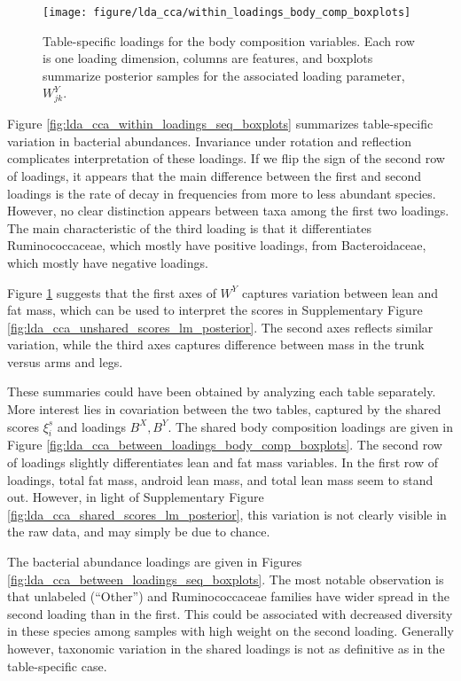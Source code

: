 \documentclass[14pt]{extarticle}
\begin{document}
\begin{figure}
  \centering
  \texttt{[image: figure/lda\_cca/within\_loadings\_body\_comp\_boxplots]}
  \caption{Table-specific loadings for the body composition variables. Each row
    is one loading dimension, columns are features, and boxplots summarize
    posterior samples for the associated loading parameter, $W_{jk}^{Y}$.
  \label{fig:lda_cca_within_loadings_body_comp_boxplots}}
\end{figure}

Figure \ref{fig:lda_cca_within_loadings_seq_boxplots} summarizes table-specific variation in
bacterial abundances. Invariance under rotation and reflection complicates
interpretation of these loadings. If we flip the sign of the second row of
loadings, it appears that the main difference between the first and second
loadings is the rate of decay in frequencies from more to less abundant species.
However, no clear distinction appears between taxa among the first two loadings.
The main characteristic of the third loading is that it differentiates
Ruminococcaceae, which mostly have positive loadings, from Bacteroidaceae, which
mostly have negative loadings.

Figure \ref{fig:lda_cca_within_loadings_body_comp_boxplots} suggests that the
first axes of $W^{Y}$ captures variation between lean and fat mass, which can be
used to interpret the scores in Supplementary Figure
\ref{fig:lda_cca_unshared_scores_lm_posterior}. The second axes reflects similar
variation, while the third axes captures difference between mass in the trunk
versus arms and legs.

These summaries could have been obtained by analyzing each table separately.
More interest lies in covariation between the two tables, captured by the shared
scores $\xi_{i}^{s}$ and loadings $B^{X}, B^{Y}$. The shared body composition
loadings are given in Figure
\ref{fig:lda_cca_between_loadings_body_comp_boxplots}. The second row of
loadings slightly differentiates lean and fat mass variables. In the first row
of loadings, total fat mass, android lean mass, and total lean mass seem to
stand out. However, in light of Supplementary Figure
\ref{fig:lda_cca_shared_scores_lm_posterior}, this variation is not clearly
visible in the raw data, and may simply be due to chance.

The bacterial abundance loadings are given in Figures
\ref{fig:lda_cca_between_loadings_seq_boxplots}. The most notable observation is
that unlabeled (``Other'') and Ruminococcaceae families have wider spread in the
second loading than in the first. This could be associated with decreased
diversity in these species among samples with high weight on the second loading.
Generally however, taxonomic variation in the shared loadings is not as
definitive as in the table-specific case.
\end{document}
